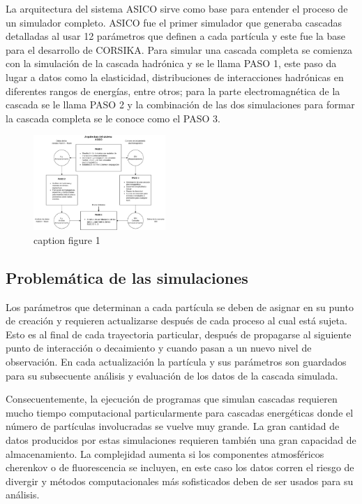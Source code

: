 La arquitectura del sistema ASICO sirve como base para entender el proceso de un simulador completo. ASICO fue el primer simulador que generaba cascadas detalladas al usar 12 parámetros que definen a cada partícula y este fue la base para el desarrollo de CORSIKA.
Para simular una cascada completa se comienza con la simulación de la cascada hadrónica y se le llama PASO 1, este paso da lugar a datos como la elasticidad, distribuciones de interacciones hadrónicas en diferentes rangos de energías, entre otros; para la parte electromagnética de la cascada se le llama PASO 2 y la combinación de las dos simulaciones para formar la cascada completa se le conoce como el PASO 3.

\begin{figure}
    \centering
    \includegraphics[width=50mm,scale=0.5]{Figures/asico-jpg.jpg}
    \decoRule
    \caption[asicoarq]{caption figure 1}
    \label{fig:asicoarq}
\end{figure}


\subsection{Problemática de las simulaciones}

Los parámetros que determinan a cada partícula se deben de asignar en su punto de creación y requieren actualizarse después de cada proceso al cual está sujeta. Esto es al final de cada trayectoria particular, después de propagarse al siguiente punto de interacción o decaimiento y cuando pasan a un nuevo nivel de observación. En cada actualización la partícula y sus parámetros son guardados para su subsecuente análisis y evaluación de los datos de la cascada simulada.

Consecuentemente, la ejecución de programas que simulan cascadas requieren mucho tiempo computacional  particularmente para cascadas energéticas donde el número de partículas involucradas se vuelve muy grande. La gran cantidad de datos producidos por estas simulaciones requieren también una gran capacidad de almacenamiento. La complejidad aumenta si los componentes atmosféricos cherenkov o de fluorescencia se incluyen, en este caso los datos corren el riesgo de divergir y métodos computacionales más sofisticados deben de ser usados para su análisis.

